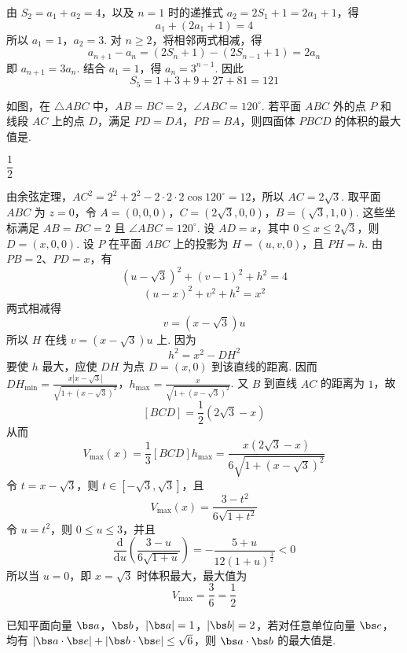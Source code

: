 \begin{solution}
由 \(S_2=a_1+a_2=4\)，以及 \(n=1\) 时的递推式 \(a_2=2S_1+1=2a_1+1\)，得
\[
a_1+(2a_1+1)=4
\]
所以 \(a_1=1\)，\(a_2=3\). 对 \(n\geqslant2\)，将相邻两式相减，得
\[
a_{n+1}-a_n=(2S_n+1)-(2S_{n-1}+1)=2a_n
\]
即 \(a_{n+1}=3a_n\). 结合 \(a_1=1\)，得 \(a_n=3^{n-1}\). 因此
\[
S_5=1+3+9+27+81=121
\]
\end{solution}

\begin{problem}
如图，在 \( \triangle ABC \) 中，\( AB=BC=2 \)，\( \angle ABC=120^\circ \). 若平面 \(ABC\) 外的点 \(P\) 和线段 \(AC\) 上的点 \(D\)，满足 \( PD=DA \)，\( PB=BA \)，则四面体 \(PBCD\) 的体积的最大值是\fillinblank{}.

\end{problem}

\begin{answer}
\(\dfrac12\)
\end{answer}

\begin{solution}
由余弦定理，\(AC^2=2^2+2^2-2\cdot2\cdot2\cos120^\circ=12\)，所以 \(AC=2\sqrt3\). 取平面 \(ABC\) 为 \(z=0\)，令
\(A=(0,0,0)\)，\(C=(2\sqrt3,0,0)\)，\(B=(\sqrt3,1,0)\).
这些坐标满足 \(AB=BC=2\) 且 \(\angle ABC=120^\circ\). 设 \(AD=x\)，其中 \(0\leqslant x\leqslant2\sqrt3\)，则 \(D=(x,0,0)\). 设 \(P\) 在平面 \(ABC\) 上的投影为 \(H=(u,v,0)\)，且 \(PH=h\). 由 \(PB=2\)、\(PD=x\)，有
\[
(u-\sqrt3)^2+(v-1)^2+h^2=4
\]
\[
(u-x)^2+v^2+h^2=x^2
\]
两式相减得
\[
v=(x-\sqrt3)u
\]
所以 \(H\) 在线 \(v=(x-\sqrt3)u\) 上. 因为
\[
h^2=x^2-DH^2
\]
要使 \(h\) 最大，应使 \(DH\) 为点 \(D=(x,0)\) 到该直线的距离. 因而
\(DH_{\min}=\frac{x|x-\sqrt3|}{\sqrt{1+(x-\sqrt3)^2}}\)，\(h_{\max}=\frac{x}{\sqrt{1+(x-\sqrt3)^2}}\).
又 \(B\) 到直线 \(AC\) 的距离为 \(1\)，故
\[
[BCD]=\frac12(2\sqrt3-x)
\]
从而
\[
V_{\max}(x)=\frac{1}{3}[BCD]h_{\max}
=\frac{x(2\sqrt3-x)}{6\sqrt{1+(x-\sqrt3)^2}}
\]
令 \(t=x-\sqrt3\)，则 \(t\in[-\sqrt3,\sqrt3]\)，且
\[
V_{\max}(x)=\frac{3-t^2}{6\sqrt{1+t^2}}
\]
令 \(u=t^2\)，则 \(0\leqslant u\leqslant3\)，并且
\[
\frac{\mathrm d}{\mathrm du}\left(\frac{3-u}{6\sqrt{1+u}}\right)
=-\frac{5+u}{12(1+u)^{\frac{3}{2}}}<0
\]
所以当 \(u=0\)，即 \(x=\sqrt3\) 时体积最大，最大值为
\[
V_{\max}=\frac{3}{6}=\frac12
\]
\end{solution}

\begin{problem}
已知平面向量 \(\bs a\)，\(\bs b\)，\( |\bs a|=1 \)，\( |\bs b|=2 \)，若对任意单位向量 \( \bs e \)，均有 \( |\bs a\cdot \bs e|+|\bs b\cdot \bs e|\le \sqrt6 \)，则 \( \bs a\cdot \bs b \) 的最大值是\fillinblank{}.
\end{problem}

